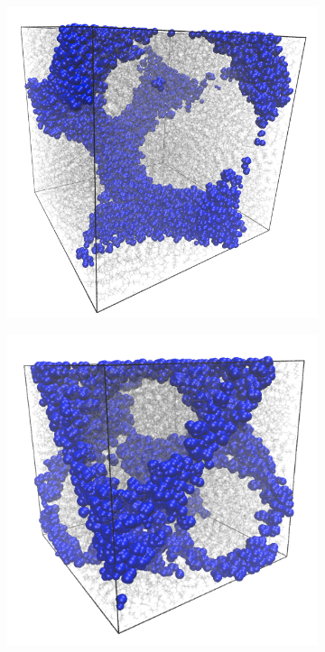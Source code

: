 \documentclass{article}
\begin{document}
  \begin{figure}
  \centering
  \vspace{-0.5cm}
  \begin{subfigure}{0.49\linewidth}
  \includegraphics[width=\linewidth]{gyroid.png}
  \caption{}\label{fig:Ia3d}
  \end{subfigure}
  \begin{subfigure}{0.49\linewidth}
  \includegraphics[width=\linewidth]{schwarz.png}

\end{subfigure}
\end{figure}
\end{document}

